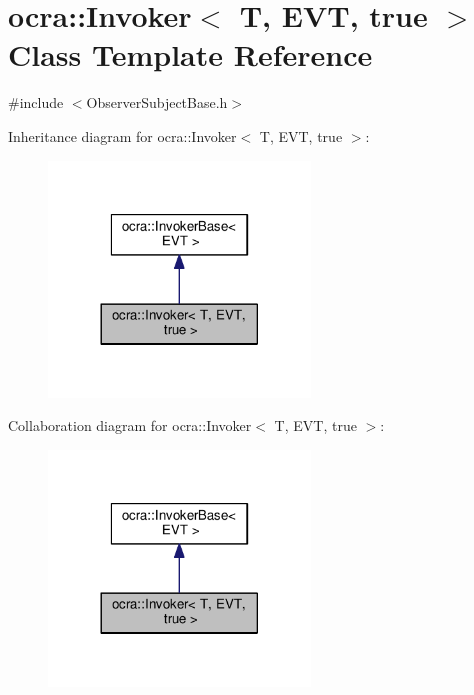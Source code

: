 \hypertarget{classocra_1_1Invoker_3_01T_00_01EVT_00_01true_01_4}{}\section{ocra\+:\+:Invoker$<$ T, E\+VT, true $>$ Class Template Reference}
\label{classocra_1_1Invoker_3_01T_00_01EVT_00_01true_01_4}


{\ttfamily \#include $<$Observer\+Subject\+Base.\+h$>$}



Inheritance diagram for ocra\+:\+:Invoker$<$ T, E\+VT, true $>$\+:
\nopagebreak
\begin{figure}[H]
\begin{center}
\leavevmode
\includegraphics[width=197pt]{d6/d68/classocra_1_1Invoker_3_01T_00_01EVT_00_01true_01_4__inherit__graph}
\end{center}
\end{figure}


Collaboration diagram for ocra\+:\+:Invoker$<$ T, E\+VT, true $>$\+:
\nopagebreak
\begin{figure}[H]
\begin{center}
\leavevmode
\includegraphics[width=197pt]{d5/dd3/classocra_1_1Invoker_3_01T_00_01EVT_00_01true_01_4__coll__graph}
\end{center}
\end{figure}
